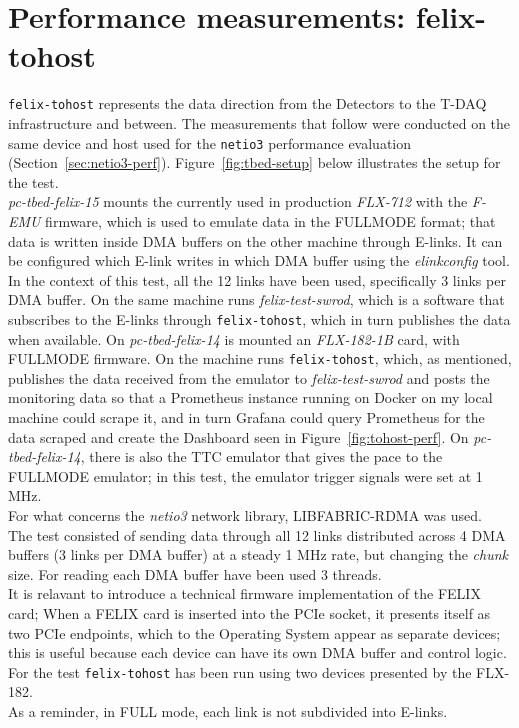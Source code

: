 \clearpage
\section{Performance measurements: felix-tohost}

\texttt{felix-tohost} represents the data direction from the Detectors to the T-DAQ infrastructure and between. The measurements that follow were conducted on the same device and host used for the \texttt{netio3} performance evaluation (Section~\ref{sec:netio3-perf}). 
Figure~\ref{fig:tbed-setup} below illustrates the setup for the test.\\
\emph{pc-tbed-felix-15} mounts the currently used in production \emph{FLX-712} with the \emph{F-EMU} firmware, which is used to emulate data in the FULLMODE format; that data is written inside \acs{DMA} buffers on the other machine through \acs{E-link}s. It can be configured which \acs{E-link} writes in which \acs{DMA} buffer using the \emph{elinkconfig} tool. In the context of this test, all the 12 links have been used, specifically 3 links per \acs{DMA} buffer. 
On the same machine runs \emph{felix-test-swrod}, which is a software that subscribes to the \acs{E-link}s through \texttt{felix-tohost}, which in turn publishes the data when available.
On \emph{pc-tbed-felix-14} is mounted an \emph{FLX-182-1B} card, with FULLMODE firmware. On the machine runs \texttt{felix-tohost}, which, as mentioned, publishes the data received from the emulator to \emph{felix-test-swrod} and posts the monitoring data so that a Prometheus instance running on Docker on my local machine could scrape it, and in turn Grafana could query Prometheus for the data scraped and create the Dashboard seen in Figure~\ref{fig:tohost-perf}. On \emph{pc-tbed-felix-14}, there is also the \acl{TTC} emulator that gives the pace to the FULLMODE emulator; in this test, the emulator trigger signals were set at 1 MHz.\\
For what concerns the \emph{netio3} network library, LIBFABRIC-RDMA was used.\\
The test consisted of sending data through all 12 links distributed across 4 \acs{DMA} buffers (3 links per \acs{DMA} buffer) at a steady 1 MHz rate, but changing the \emph{chunk} size. For reading each DMA buffer have been used 3 threads.\\
It is relavant to introduce a technical firmware implementation of the \acs{FELIX} card; When a \acs{FELIX} card is inserted into the PCIe socket, it presents itself as two PCIe endpoints, which to the Operating System appear as separate devices; this is useful because each device can have its own DMA buffer and control logic. For the test \texttt{felix-tohost} has been run using two devices presented by the FLX-182.\\
As a reminder, in FULL mode, each link is not subdivided into \acs{E-link}s.

